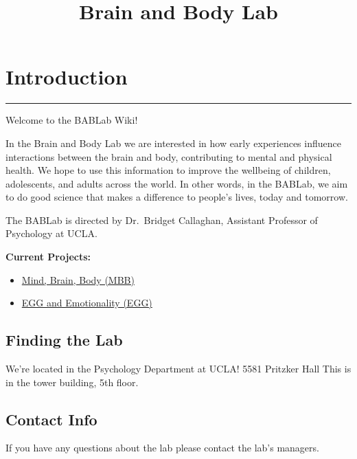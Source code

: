 \documentclass[]{book}
\title{Brain and Body Lab}
\author{}
\date{}
\providecommand{\tightlist}{%
  \setlength{\itemsep}{0pt}\setlength{\parskip}{0pt}}
\begin{document}
\maketitle

{
\setcounter{tocdepth}{1}
\tableofcontents
}
\hypertarget{introduction}{%
\chapter{Introduction}\label{introduction}}

\begin{center}\rule{0.5\linewidth}{\linethickness}\end{center}

Welcome to the BABLab Wiki!

In the Brain and Body Lab we are interested in how early experiences influence interactions between the brain and body, contributing to mental and physical health. We hope to use this information to improve the wellbeing of children, adolescents, and adults across the world. In other words, in the BABLab, we aim to do good science that makes a difference to people's lives, today and tomorrow.

The BABLab is directed by Dr.~Bridget Callaghan, Assistant Professor of Psychology at UCLA.

\textbf{Current Projects:}

\begin{itemize}
\tightlist
\item
  \href{https://osf.io/ha3rq/}{Mind, Brain, Body (MBB)}
\item
  \href{https://osf.io/nf2bv/}{EGG and Emotionality (EGG)}
\end{itemize}

\hypertarget{finding-the-lab}{%
\section{Finding the Lab}\label{finding-the-lab}}

We're located in the Psychology Department at UCLA!
5581 Pritzker Hall
This is in the tower building, 5th floor.

\hypertarget{contact-info}{%
\section{Contact Info}\label{contact-info}}

If you have any questions about the lab please contact the lab's managers.
\end{document}

